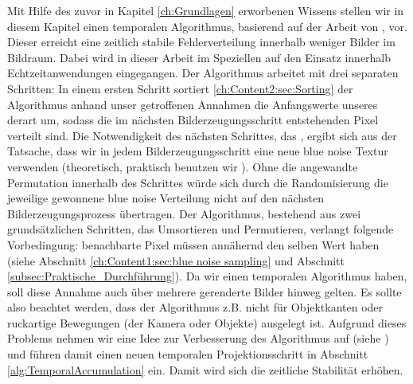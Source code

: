 Mit Hilfe des zuvor in Kapitel \ref{ch:Grundlagen} erworbenen Wissens stellen wir in diesem Kapitel einen temporalen 
Algorithmus, basierend auf der Arbeit von \cite{hal02158423}, vor. Dieser erreicht eine zeitlich stabile 
 Fehlerverteilung innerhalb weniger Bilder im Bildraum. Dabei wird in 
dieser Arbeit im Speziellen auf den Einsatz innerhalb Echtzeitanwendungen eingegangen. 
Der Algorithmus arbeitet mit drei separaten Schritten: 
In einem ersten Schritt sortiert \ref{ch:Content2:sec:Sorting} der Algorithmus anhand unser getroffenen 
 Annahmen die Anfangswerte unseres 
derart um, sodass die im nächsten Bilderzeugungsschritt entstehenden Pixel 
verteilt sind. Die Notwendigkeit des nächsten Schrittes, das , ergibt sich 
aus der Tatsache, dass wir in jedem Bilderzeugungsschritt eine neue blue noise Textur verwenden (theoretisch,
praktisch benutzen wir ). Ohne die angewandte Permutation innerhalb 
des Schrittes würde sich durch die Randomisierung die jeweilige gewonnene blue noise Verteilung nicht auf den 
nächsten Bilderzeugungsprozess übertragen.  
Der Algorithmus, bestehend aus zwei grundsätzlichen Schritten, das Umsortieren und Permutieren, 
verlangt folgende Vorbedingung:
benachbarte Pixel müssen annähernd den selben Wert haben (siehe Abschnitt \ref{ch:Content1:sec:blue noise sampling}
und Abschnitt \ref{subsec:Praktische_Durchführung}). Da wir einen temporalen Algorithmus haben, soll diese Annahme 
auch über mehrere gerenderte Bilder hinweg gelten. Es sollte also beachtet werden, dass der Algorithmus z.B. nicht 
für Objektkanten oder ruckartige Bewegungen (der Kamera oder Objekte) ausgelegt ist.
Aufgrund dieses Problems nehmen wir eine Idee zur Verbesserung des Algorithmus auf (siehe \cite{hal02158423}) und führen 
damit einen neuen temporalen Projektionsschritt in Abschnitt \ref{alg:TemporalAccumulation} ein. Damit wird sich die 
zeitliche Stabilität erhöhen.
 

